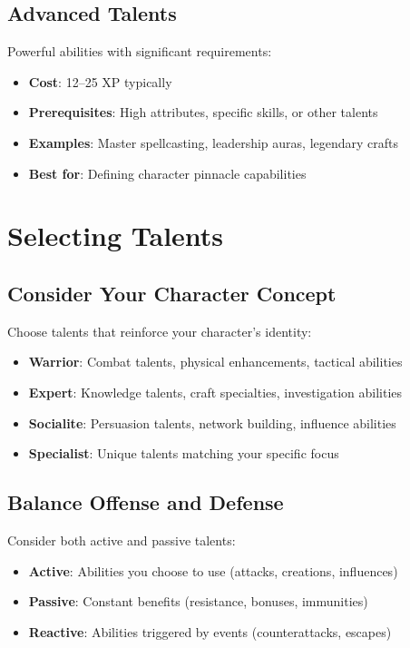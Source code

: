 \subsection*{Advanced Talents}
Powerful abilities with significant requirements:
\begin{itemize}
\item \textbf{Cost}: 12--25 XP typically
\item \textbf{Prerequisites}: High attributes, specific skills, or other talents
\item \textbf{Examples}: Master spellcasting, leadership auras, legendary crafts
\item \textbf{Best for}: Defining character pinnacle capabilities
\end{itemize}

\section{Selecting Talents}

\subsection*{Consider Your Character Concept}
Choose talents that reinforce your character's identity:
\begin{itemize}
\item \textbf{Warrior}: Combat talents, physical enhancements, tactical abilities
\item \textbf{Expert}: Knowledge talents, craft specialties, investigation abilities
\item \textbf{Socialite}: Persuasion talents, network building, influence abilities
\item \textbf{Specialist}: Unique talents matching your specific focus
\end{itemize}

\subsection*{Balance Offense and Defense}
Consider both active and passive talents:
\begin{itemize}
\item \textbf{Active}: Abilities you choose to use (attacks, creations, influences)
\item \textbf{Passive}: Constant benefits (resistance, bonuses, immunities)
\item \textbf{Reactive}: Abilities triggered by events (counterattacks, escapes)
\end{itemize}

